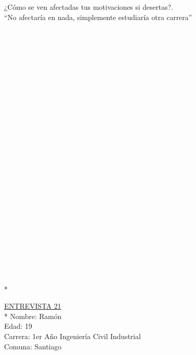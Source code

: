 ¿Cómo se ven afectadas tus motivaciones si desertas?.\\

``No afectaría en nada, simplemente estudiaría otra carrera''\\
\\
\\
\\
\\
\\
\\
\\
\\
\\
\\
\\
\\
\\
\\
\\
\\
\\
\\
\\
\\
\\
\\
\\
\\
\\
\\*

\underline {ENTREVISTA 21}\\*
Nombre: Ramón\\
Edad: 19 \\
Carrera: 1er Año Ingeniería Civil Industrial\\
Comuna: Santiago\\

